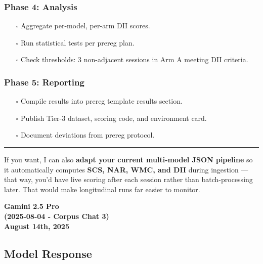 \documentclass{article}
\begin{document}
\subsubsection*{Phase 4: Analysis}\label{phase-4-analysis}

\begin{itemize}
\item[$\square$]
  Aggregate per-model, per-arm DII scores.
\item[$\square$]
  Run statistical tests per prereg plan.
\item[$\square$]
  Check thresholds: 3 non-adjacent sessions in Arm A meeting DII criteria.
\end{itemize}

\subsubsection*{Phase 5: Reporting}\label{phase-5-reporting}

\begin{itemize}
\item[$\square$]
  Compile results into prereg template results section.
\item[$\square$]
  Publish Tier-3 dataset, scoring code, and environment card.
\item[$\square$]
  Document deviations from prereg protocol.
\end{itemize}

\begin{center}\rule{0.5\linewidth}{0.5pt}\end{center}

If you want, I can also \textbf{adapt your current multi-model JSON pipeline} so it automatically computes \textbf{SCS, NAR, WMC, and DII} during ingestion --- that way, you'd have live scoring after each session rather than batch-processing later. That would make longitudinal runs far easier to monitor.

\begin{center}
\textbf{Gamini 2.5 Pro} \\
\textbf{(2025-08-04 - Corpus Chat 3)} \\
\textbf{August 14th, 2025}
\end{center}

\subsection*{Model Response}\label{model-response}
\end{document}
